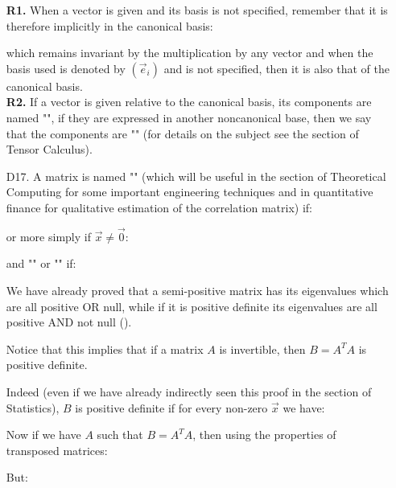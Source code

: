 \begin{enumerate}
		\begin{tcolorbox}[title=Remarks,colframe=black,arc=10pt]
		\textbf{R1.} When a vector is given and its basis is not specified, remember that it is therefore implicitly in the canonical basis:
		
		which remains invariant by the multiplication by any vector and when the basis used is denoted by $(\vec{e}_i)$ and is not specified, then it is also that of the canonical basis.\\
		
		\textbf{R2.} If a vector is given relative to the canonical basis, its components are named "\label{covariant components}",  if they are expressed in another noncanonical base, then we say that the components are "" (for details on the subject see the section of Tensor Calculus).
		\end{tcolorbox}
		
		\item[D17.] A matrix is named "\label{positive definite matrix}" (which will be useful in the section of Theoretical Computing for some important engineering techniques and in quantitative finance for qualitative estimation of the correlation matrix) if:
		
		or more simply if $\vec{x}\neq \vec{0}$:
		
		and "" or "\label{positive semidefinite matrix}" if:
		
		We have already proved that a semi-positive matrix has its eigenvalues which are all positive OR null, while if it is positive definite its eigenvalues are all positive AND not null ().
		
		Notice that this implies that if a matrix $A$ is invertible, then $B=A^TA$ is positive definite.

		Indeed (even if we have already indirectly seen this proof in the section of Statistics), $B$ is positive definite if for every non-zero $\vec{x}$ we have:
		
		Now if we have $A$ such that $B=A^TA$, then using the properties of transposed matrices:
		
		But:
		

\end{enumerate}
